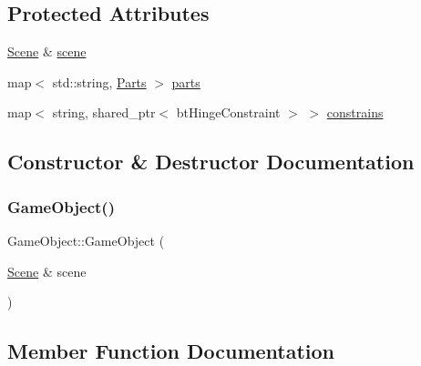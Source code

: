 \subsection*{Protected Attributes}
\begin{DoxyCompactItemize}
\item 
\mbox{\hyperlink{class_scene}{Scene}} \& \mbox{\hyperlink{class_game_object_aeea61de934e13603696b4ed00e9fe42e}{scene}}
\item 
map$<$ std\+::string, \mbox{\hyperlink{struct_game_object_1_1_parts}{Parts}} $>$ \mbox{\hyperlink{class_game_object_a793b910e9851728a522aba85fe7b829e}{parts}}
\item 
map$<$ string, shared\+\_\+ptr$<$ bt\+Hinge\+Constraint $>$ $>$ \mbox{\hyperlink{class_game_object_ab6ea7ad55d467cc31cd6addf2465f40c}{constrains}}
\end{DoxyCompactItemize}


\subsection{Constructor \& Destructor Documentation}
\mbox{\label{class_game_object_ab2c6683579548906dc8432bbd823fd76}} 
\subsubsection{\texorpdfstring{Game\+Object()}{GameObject()}}
{\footnotesize\ttfamily Game\+Object\+::\+Game\+Object (\begin{DoxyParamCaption}\item[{\mbox{\hyperlink{class_scene}{Scene}} \&}]{scene }\end{DoxyParamCaption})\hspace{0.3cm}{\ttfamily [inline]}}



\subsection{Member Function Documentation}
\mbox{\label{class_game_object_ac4d09cf168b9ad3e5ba0c31fb7872c76}} 
